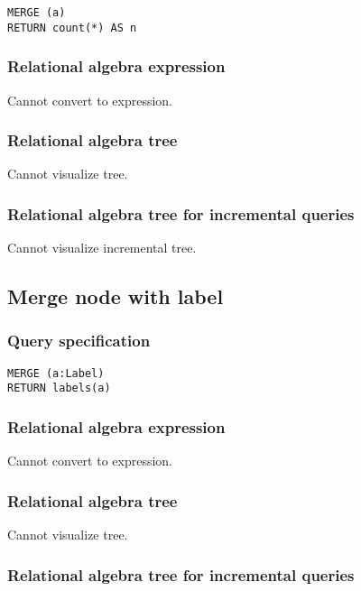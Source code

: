 \begin{lstlisting}
MERGE (a)
RETURN count(*) AS n
\end{lstlisting}

\subsubsection*{Relational algebra expression}

Cannot convert to expression.

\subsubsection*{Relational algebra tree}

Cannot visualize tree.

\subsubsection*{Relational algebra tree for incremental queries}

Cannot visualize incremental tree.

\subsection{Merge node with label}

\subsubsection*{Query specification}

\begin{lstlisting}
MERGE (a:Label)
RETURN labels(a)
\end{lstlisting}

\subsubsection*{Relational algebra expression}

Cannot convert to expression.

\subsubsection*{Relational algebra tree}

Cannot visualize tree.

\subsubsection*{Relational algebra tree for incremental queries}

